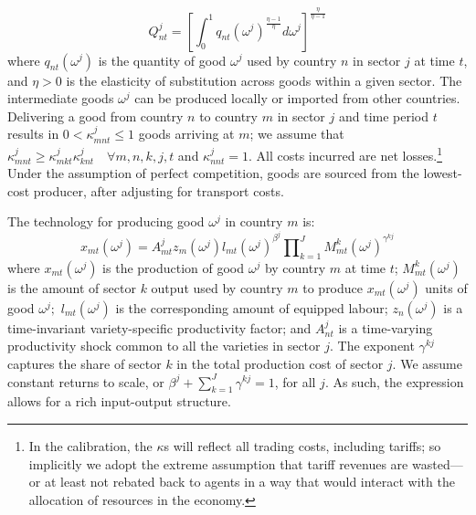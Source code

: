 \documentclass{article}
\begin{document}
\bigskip 

\bigskip 

\bigskip 

\begin{equation}
Q_{nt}^{j}=\left[ \int_{0}^{1}q_{nt}(\omega ^{j})^{\frac{\eta -1}{\eta }%
}d\omega ^{j}\right] ^{\frac{\eta }{\eta -1}}  \label{sectoroutput}
\end{equation}%
where $q_{nt}(\omega ^{j})$ is the quantity of good $\omega ^{j}$ used by
country $n$ in sector $j$ at time $t$, and $\eta >0$ is the elasticity of
substitution across goods within a given sector. The intermediate goods $%
\omega ^{j}$ can be produced locally or imported from other countries.
Delivering a good from country $n$ to country $m$ in sector $j$ and time
period $t$ results in $0<\kappa _{mnt}^{j}\leq 1$ goods arriving at $m$; we
assume that $\kappa _{mnt}^{j}\geq \kappa _{mkt}^{j}\kappa _{knt}^{j}\quad
\forall m,n,k,j,t$ and $\kappa _{nnt}^{j}=1$. All costs incurred are net
losses.\footnote{%
In the calibration, the $\kappa $s will reflect all trading costs, including
tariffs; so implicitly we adopt the extreme assumption that tariff revenues
are wasted---or at least not rebated back to agents in a way that would
interact with the allocation of resources in the economy.} Under the
assumption of perfect competition, goods are sourced from the lowest-cost
producer, after adjusting for transport costs.

The technology for producing good $\omega ^{j}$ in country $m$ is: 
\begin{equation}
x_{mt}(\omega ^{j})=A_{mt}^{j}z_{m}(\omega ^{j})l_{mt}(\omega ^{j})^{\beta
^{j}}\prod\nolimits_{k=1}^{J}M_{mt}^{k}(\omega ^{j})^{\gamma ^{kj}}
\label{eqinput}
\end{equation}%
where $x_{mt}(\omega ^{j})$ is the production of good $\omega ^{j}$ by
country $m$ at time $t$; $M_{mt}^{k}(\omega ^{j})$ is the amount of sector $%
k $ output used by country $m$ to produce $x_{mt}(\omega ^{j})$ units of
good $\omega ^{j};$ $l_{mt}(\omega ^{j})$ is the corresponding amount of
equipped labour; $z_{n}(\omega ^{j})$ is a time-invariant variety-specific
productivity factor; and $A_{nt}^{j}$ is a time-varying productivity shock
common to all the varieties in sector $j$. The exponent $\gamma ^{kj}$
captures the share of sector $k$ in the total production cost of sector $j.$
We assume constant returns to scale, or $\beta ^{j}+\sum_{k=1}^{J}\gamma
^{kj}=1$, for all $j$. As such, the expression allows for a rich
input-output structure.
\end{document}
